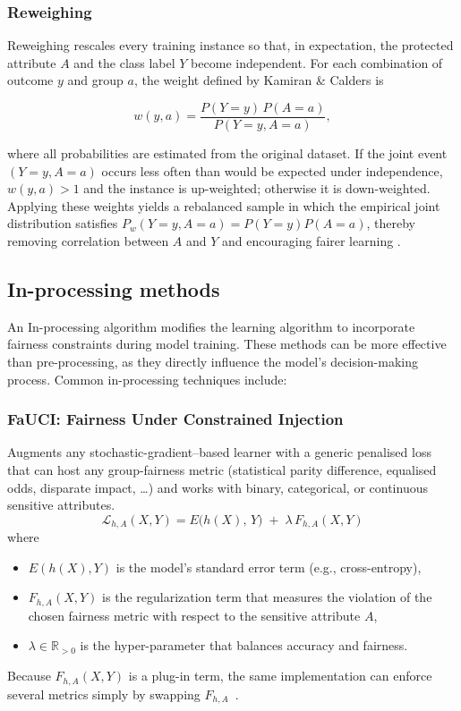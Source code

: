 \documentclass[12pt,a4paper,openright,twoside]{book}
\begin{document}
\subsubsection{Reweighing}
Reweighing rescales every training instance so that, in expectation, the protected attribute $A$ and the class label $Y$ become independent.  
For each combination of outcome $y$ and group $a$, the weight defined by Kamiran \& Calders is  

\begin{equation}
    w(y,a)=\frac{P(Y=y)\,P(A=a)}{P(Y=y,A=a)},
\end{equation}

where all probabilities are estimated from the original dataset.  
If the joint event $(Y{=}y,A{=}a)$ occurs less often than would be expected under independence, $w(y,a)\!>\!1$ and the instance is up-weighted; otherwise it is down-weighted.  
Applying these weights yields a rebalanced sample in which the empirical joint distribution satisfies $P_w(Y=y,A=a)=P(Y=y)P(A=a)$, thereby removing correlation between $A$ and $Y$ and encouraging fairer learning \cite{8907b030dc7644cabfab035645f9b9da}.

\subsection{In-processing methods} 
An In-processing algorithm modifies the learning algorithm to incorporate fairness constraints during model training. These methods can be more effective than pre-processing, as they directly influence the model's decision-making process. Common in-processing techniques include:
\subsubsection{FaUCI: Fairness Under Constrained Injection} Augments any stochastic-gradient–based learner with a generic penalised loss that can host any group-fairness metric (statistical parity difference, equalised odds, disparate impact, …) and works with binary, categorical, or continuous sensitive attributes.
\begin{equation}
\mathcal{L}_{h,A}(X,Y) = E\!\bigl(h(X),\, Y\bigr) \;+\; \lambda\, F_{h,A}(X,Y)
\end{equation}
where
\begin{itemize}
    \item \(E(h(X),Y)\) is the model’s standard error term (e.g., cross-entropy),
    \item \(F_{h,A}(X,Y)\) is the regularization term that measures the violation of the chosen fairness metric with respect to the sensitive attribute \(A\),
    \item \(\lambda \in \mathbb{R}_{>0}\) is the hyper-parameter that balances accuracy and fairness.
\end{itemize}
Because $F_{h,A}(X,Y)$ is a plug-in term, the same implementation can enforce several metrics simply by swapping $F_{h,A}$~\cite{fauci-aequitas2024}.
\end{document}
